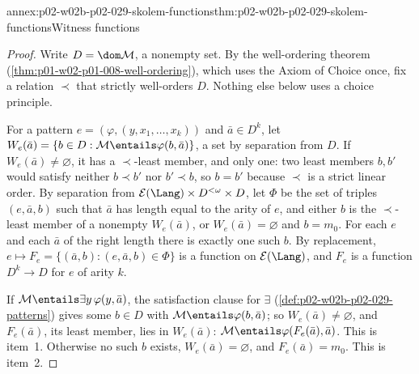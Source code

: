 \begin{annexitem}{annex:p02-w02b-p02-029-skolem-functions}{thm:p02-w02b-p02-029-skolem-functions}{Witness functions}
\begin{proof}
Write \(D=\dom\mathcal M\), a nonempty set. By the well-ordering theorem
(\cref{thm:p01-w02-p01-008-well-ordering}), which uses the Axiom of Choice
once, fix a relation \(\prec\) that strictly well-orders \(D\). Nothing else
below uses a choice principle.

For a pattern \(e=(\varphi,(y,x_1,\ldots,x_k))\) and
\(\bar a\in D^k\), let
\(W_e(\bar a)=\{b\in D:\mathcal M\entails\varphi(b,\bar a)\}\), a set by
separation from \(D\). If \(W_e(\bar a)\neq\varnothing\), it has a
\(\prec\)-least member, and only one: two least members \(b,b'\) would
satisfy neither \(b\prec b'\) nor \(b'\prec b\), so \(b=b'\) because
\(\prec\) is a strict linear order. By separation from
\(\mathcal E(\Lang)\times D^{<\omega}\times D\), let \(\Phi\) be the set of
triples \((e,\bar a,b)\) such that \(\bar a\) has length equal to the arity
of \(e\), and either \(b\) is the \(\prec\)-least member of a nonempty
\(W_e(\bar a)\), or \(W_e(\bar a)=\varnothing\) and \(b=m_0\). For each
\(e\) and each \(\bar a\) of the right length there is exactly one such
\(b\). By replacement, \(e\mapsto F_e=\{(\bar a,b):(e,\bar a,b)\in\Phi\}\) is a
function on \(\mathcal E(\Lang)\), and \(F_e\) is a function
\(D^k\to D\) for \(e\) of arity \(k\).

If \(\mathcal M\entails\exists y\,\varphi(y,\bar a)\), the satisfaction
clause for \(\exists\) (\cref{def:p02-w02b-p02-029-patterns}) gives some
\(b\in D\) with \(\mathcal M\entails\varphi(b,\bar a)\); so
\(W_e(\bar a)\neq\varnothing\), and \(F_e(\bar a)\), its least member, lies
in \(W_e(\bar a)\): \(\mathcal M\entails\varphi(F_e(\bar a),\bar a)\). This
is item~1. Otherwise no such \(b\) exists, \(W_e(\bar a)=\varnothing\), and
\(F_e(\bar a)=m_0\). This is item~2.
\end{proof}
\end{annexitem}

